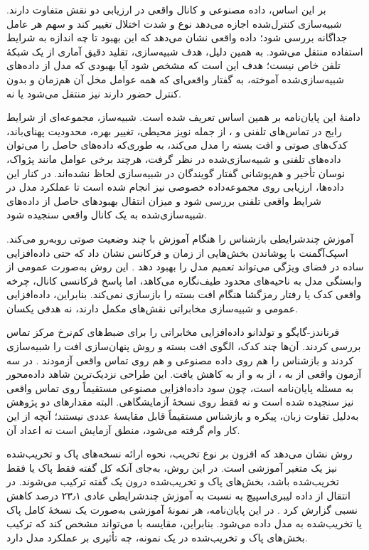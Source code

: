 بر این اساس، داده مصنوعی و کانال واقعی در ارزیابی دو نقش متفاوت دارند. شبیه‌سازی کنترل‌شده اجازه می‌دهد نوع و شدت اختلال تغییر کند و سهم هر عامل جداگانه بررسی شود؛ داده واقعی نشان می‌دهد که این بهبود تا چه اندازه به شرایط استفاده منتقل می‌شود. به همین دلیل، هدف شبیه‌سازی، تقلید دقیق آماری از یک شبکهٔ تلفن خاص نیست؛ هدف این است که مشخص شود آیا بهبودی که مدل از داده‌های شبیه‌سازی‌شده آموخته، به گفتار واقعی‌ای که همه عوامل مخل آن هم‌زمان و بدون کنترل حضور دارند نیز منتقل می‌شود یا نه. 

دامنهٔ این پایان‌نامه بر همین اساس تعریف شده است. شبیه‌ساز، مجموعه‌ای از شرایط رایج در تماس‌های تلفنی و ، از جمله نویز محیطی، تغییر بهره، محدودیت پهنای‌باند، کدک‌های صوتی و افت بسته را مدل می‌کند، به طوری‌که داده‌های حاصل را می‌توان داده‌های تلفنی و  شبیه‌سازی‌شده در نظر گرفت، هرچند برخی عوامل مانند پژواک، نوسان تأخیر و هم‌پوشانی گفتار گویندگان در شبیه‌سازی لحاظ نشده‌اند. در کنار این داده‌ها، ارزیابی روی مجموعه‌داده خصوصی  نیز انجام شده است تا عملکرد مدل در شرایط واقعی تلفنی بررسی شود و میزان انتقال بهبودهای حاصل از داده‌های شبیه‌سازی‌شده به یک کانال واقعی سنجیده شود.


آموزش چندشرایطی بازشناس را هنگام آموزش با چند وضعیت صوتی روبه‌رو می‌کند. اسپک‌آگمنت با پوشاندن بخش‌هایی از زمان و فرکانس نشان داد که حتی داده‌افزایی ساده در فضای ویژگی می‌تواند تعمیم مدل را بهبود دهد . این روش به‌صورت عمومی از وابستگی مدل به ناحیه‌های محدود طیف‌نگاره می‌کاهد، اما پاسخ فرکانسی کانال، چرخه واقعی کدک یا رفتار رمزگشا هنگام افت بسته را بازسازی نمی‌کند. بنابراین، داده‌افزایی عمومی و شبیه‌سازی مخابراتی نقش‌های مکمل دارند، نه هدفی یکسان.

فرناندز-گایگو و تولدانو داده‌افزایی مخابراتی را برای ضبط‌های کم‌نرخ مرکز تماس بررسی کردند. آن‌ها چند کدک، الگوی افت بسته و روش پنهان‌سازی افت را شبیه‌سازی کردند و بازشناس را هم روی داده مصنوعی و هم روی تماس واقعی آزمودند .  در سه آزمون واقعی از  به ، از  به  و از  به  کاهش یافت. این طراحی نزدیک‌ترین شاهد داده‌محور به مسئله پایان‌نامه است، چون سود داده‌افزایی مصنوعی مستقیماً روی تماس واقعی نیز سنجیده شده است و نه فقط روی نسخهٔ آزمایشگاهی. البته مقدارهای دو پژوهش به‌دلیل تفاوت زبان، پیکره و بازشناس مستقیماً قابل مقایسهٔ عددی نیستند؛ آنچه از این کار وام گرفته می‌شود، منطق آزمایش است نه اعداد آن.

روش  نشان می‌دهد که افزون بر نوع تخریب، نحوه ارائه نسخه‌های پاک و تخریب‌شده نیز یک متغیر آموزشی است. در این روش، به‌جای آنکه کل گفته فقط پاک یا فقط تخریب‌شده باشد، بخش‌های پاک و تخریب‌شده درون یک گفته ترکیب می‌شوند.  در انتقال از داده لیبری‌اسپیچ به  نسبت به آموزش چندشرایطی عادی ۲۳٫۱ درصد کاهش نسبی  گزارش کرد . در این پایان‌نامه، هر نمونهٔ آموزشی به‌صورت یک نسخهٔ کامل پاک یا تخریب‌شده به مدل داده می‌شود. بنابراین، مقایسه با  می‌تواند مشخص کند که ترکیب بخش‌های پاک و تخریب‌شده در یک نمونه، چه تأثیری بر عملکرد مدل دارد.

